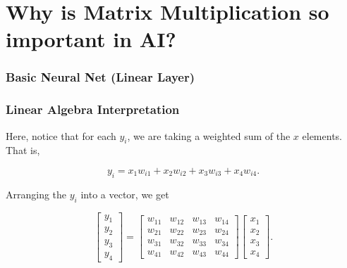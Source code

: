 \documentclass[main.tex]{subfiles}
\begin{document}
\section{Why is Matrix Multiplication so important in AI?}
\begin{frame}
  \frametitle{Basic Neural Net (Linear Layer)}
  \centering
\end{frame}

\begin{frame}
  \frametitle{Linear Algebra Interpretation}
  Here, notice that for each \(y_i\), we are taking a weighted sum of the
  \(x\) elements. That is,

  \[y_i = x_1 w_{i1} + x_2 w_{i2} + x_3 w_{i3} + x_4w_{i4}.\]

  \pause
  Arranging the \(y_i\) into a vector, we get

  \[
    \begin{bmatrix}
      y_1 \\ y_2 \\ y_3 \\ y_4
    \end{bmatrix}
    =
    \begin{bmatrix}
      w_{11} & w_{12} & w_{13} & w_{14} \\
      w_{21} & w_{22} & w_{23} & w_{24} \\
      w_{31} & w_{32} & w_{33} & w_{34} \\
      w_{41} & w_{42} & w_{43} & w_{44}
    \end{bmatrix}
    \begin{bmatrix}
      x_1 \\ x_2 \\ x_3 \\ x_4
    \end{bmatrix}.
  \]

\end{frame}
\end{document}
